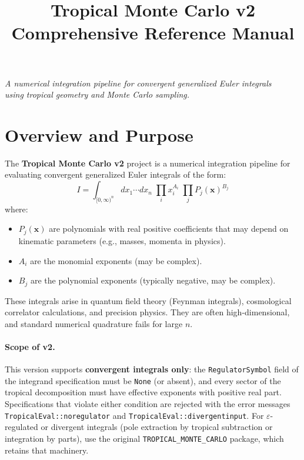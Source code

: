 \documentclass[11pt,a4paper]{article}
\title{\textbf{Tropical Monte Carlo v2} \\ \Large Comprehensive Reference Manual}
\author{}
\date{}
\begin{document}
\maketitle
\thispagestyle{empty}

\vfill
\begin{center}
\textit{A numerical integration pipeline for convergent generalized Euler integrals \\
using tropical geometry and Monte Carlo sampling.}
\end{center}
\vfill

\newpage
\tableofcontents
\newpage

\section{Overview and Purpose}

The \textbf{Tropical Monte Carlo v2} project is a numerical integration pipeline for evaluating convergent generalized Euler integrals of the form:
\begin{equation}\label{eq:main}
I = \int_{[0,\infty)^n} dx_1 \cdots dx_n \;\prod_{i} x_i^{A_i} \;\prod_{j} P_j(\mathbf{x})^{B_j}
\end{equation}
where:
\begin{itemize}
  \item $P_j(\mathbf{x})$ are polynomials with real positive coefficients that may depend on kinematic parameters (e.g., masses, momenta in physics).
  \item $A_i$ are the monomial exponents (may be complex).
  \item $B_j$ are the polynomial exponents (typically negative, may be complex).
\end{itemize}

These integrals arise in quantum field theory (Feynman integrals), cosmological correlator calculations, and precision physics. They are often high-dimensional, and standard numerical quadrature fails for large $n$.

\paragraph{Scope of v2.} This version supports \textbf{convergent integrals only}: the \texttt{RegulatorSymbol} field of the integrand specification must be \texttt{None} (or absent), and every sector of the tropical decomposition must have effective exponents with positive real part. Specifications that violate either condition are rejected with the error messages \texttt{TropicalEval::noregulator} and \texttt{TropicalEval::divergentinput}. For $\varepsilon$-regulated or divergent integrals (pole extraction by tropical subtraction or integration by parts), use the original \texttt{TROPICAL\_MONTE\_CARLO} package, which retains that machinery.
\end{document}
